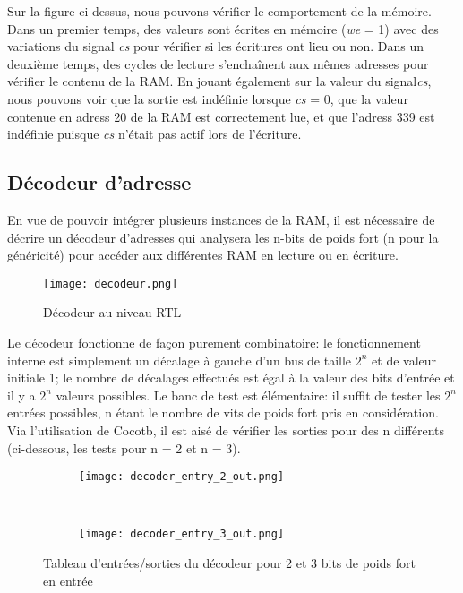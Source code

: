 \indent Sur la figure ci-dessus, nous pouvons vérifier le comportement de la mémoire.
Dans un premier temps, des valeurs sont écrites en mémoire (\textit{we} = 1) avec des variations du signal \textit{cs} pour vérifier si les écritures ont lieu ou non.
Dans un deuxième temps, des cycles de lecture s'enchaînent aux mêmes adresses pour vérifier le contenu de la RAM.
En jouant également sur la valeur du signal\textit{cs}, nous pouvons voir que la sortie est indéfinie lorsque \textit{cs} = 0, que la valeur contenue en adress 20 de la RAM est correctement lue, et que l'adress 339 est indéfinie puisque \textit{cs} n'était pas actif lors de l'écriture.

\subsection{Décodeur d'adresse}

\indent En vue de pouvoir intégrer plusieurs instances de la RAM, il est nécessaire de décrire un décodeur d'adresses qui analysera les n-bits de poids fort (n pour la généricité) pour accéder aux différentes RAM en lecture ou en écriture.

\begin{figure}[h]
	\centering
	\texttt{[image: decodeur.png]}
	\caption{Décodeur au niveau RTL}
	\label{fig:synth_bloc_decodeur}
\end{figure}

\indent Le décodeur fonctionne de façon purement combinatoire: le fonctionnement interne est simplement un décalage à gauche d'un bus de taille $ 2^{n} $ et de valeur initiale 1; le nombre de décalages effectués est égal à la valeur des bits d'entrée et il y a $ 2^{n} $ valeurs possibles.
Le banc de test est élémentaire: il suffit de tester les $ 2^{n} $ entrées possibles, n étant le nombre de vits de poids fort pris en considération. Via l'utilisation de Cocotb, il est aisé de vérifier les sorties pour des n différents (ci-dessous, les tests pour n = 2 et n = 3).

\begin{figure}[h]
	\centering
	\begin{subfigure}{0.3\textwidth}
		\texttt{[image: decoder\_entry\_2\_out.png]} 
	\end{subfigure}
	\, \, \, \,
	\begin{subfigure}{0.3\textwidth}
		\texttt{[image: decoder\_entry\_3\_out.png]}
	\end{subfigure}
	\caption{Tableau d'entrées/sorties du décodeur pour 2 et 3 bits de poids fort en entrée}
	\label{fig:stdout_decoder_2_3}
\end{figure}


